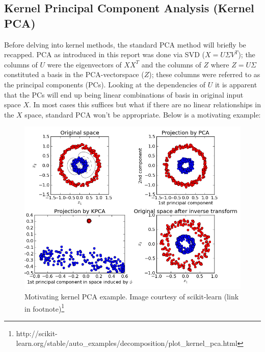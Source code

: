 \subsection{Kernel Principal Component Analysis (Kernel PCA)}

Before delving into kernel methods, the standard PCA method will briefly be recapped. PCA as introduced in this report was done via SVD ($X=U\Sigma V^T$); the columns of $U$ were the eigenvectors of $XX^T$ and the columns of $Z$ where $Z=U\Sigma$ constituted a basis in the PCA-vectorspace ($Z$); these columns were referred to as the principal components (PCs). 
Looking at the dependencies of $U$ it is apparent that the PCs will end up being linear combinations of basis in original input space $X$. 
In most cases this suffices but what if there are no linear relationships in the $X$ space, standard PCA won't be appropriate.
Below is a motivating example:

\begin{figure}[H]
\center
\includegraphics[width=\textwidth]{figures/kernel_pca_example.png}
	\caption{Motivating kernel PCA example. Image courtesy of scikit-learn (link in footnote)\footnote{http://scikit-learn.org/stable/auto_examples/decomposition/plot_kernel_pca.html}}
	\label{fig:motivation_kernelpca}
\end{figure}
